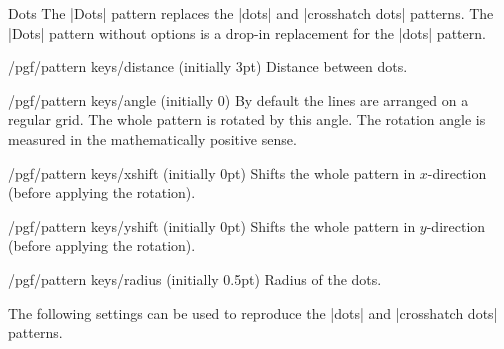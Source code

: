\begin{pattern}{Dots}
    The |Dots| pattern replaces the |dots| and |crosshatch dots| patterns. The
    |Dots| pattern without options is a drop-in replacement for the |dots|
    pattern.
    \begin{key}{/pgf/pattern keys/distance (initially 3pt)}
        Distance between dots.
    \end{key}
    \begin{key}{/pgf/pattern keys/angle (initially 0)}
        By default the lines are arranged on a regular grid. The whole pattern
        is rotated by this angle. The rotation angle is measured in the
        mathematically positive sense.
    \end{key}
    \begin{key}{/pgf/pattern keys/xshift (initially 0pt)}
        Shifts the whole pattern in $x$-direction (before applying the
        rotation).
    \end{key}
    \begin{key}{/pgf/pattern keys/yshift (initially 0pt)}
        Shifts the whole pattern in $y$-direction (before applying the
        rotation).
    \end{key}
    \begin{key}{/pgf/pattern keys/radius (initially 0.5pt)}
        Radius of the dots.
    \end{key}
    The following settings can be used to reproduce the |dots| and
    |crosshatch dots| patterns.
\begin{codeexample}[preamble={\usetikzlibrary{patterns,patterns.meta}}]
\end{codeexample}
\end{pattern}

